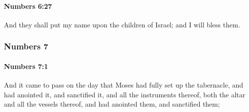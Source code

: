 		\paragraph{Numbers 6:27} %
			\label{NUMBERS-6-27}

			And they shall put my name upon the children of Israel; and I will bless them.

	\subsubsection{Numbers 7} %
		\label{NUMBERS-7}

		\paragraph{Numbers 7:1} %
			\label{NUMBERS-7-1}

			And it came to pass on the day that Moses had fully set up the tabernacle, and had anointed it, and sanctified it, and all the instruments thereof, both the altar and all the vessels thereof, and had anointed them, and sanctified them;


